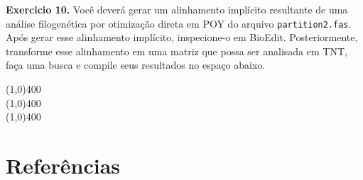\begin{refsection}
\begin{blackBlock}{\textbf{Exercicio 10.}}
Você deverá gerar um alinhamento implícito resultante de uma análise filogenética por otimização direta em POY do arquivo \texttt{partition2.fas}. Após gerar esse alinhamento implícito, inspecione-o em BioEdit. Posteriormente, transforme esse alinhamento em uma matriz que possa ser analisada em TNT, faça uma busca e compile seus resultados no espaço abaixo.

\end{blackBlock}

\vspace{200pt}

\begin{center}
\line(1,0){400}\\
\line(1,0){400}\\
\line(1,0){400}\\
\end{center}




\section{Referências}\label{tut10:refs}
\printbibliography[heading=none]
\end{refsection}
%  
